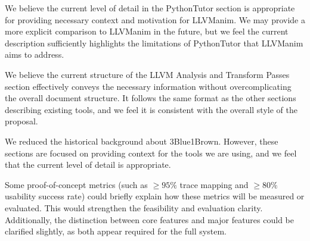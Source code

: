 {
  We believe the current level of detail in the PythonTutor section is appropriate for providing necessary context and motivation for LLVManim. We may provide a more explicit comparison to LLVManim in the future, but we feel the current description sufficiently highlights the limitations of PythonTutor that LLVManim aims to address.
}

{
  We believe the current structure of the LLVM Analysis and Transform Passes section effectively conveys the necessary information without overcomplicating the overall document structure. It follows the same format as the other sections describing existing tools, and we feel it is consistent with the overall style of the proposal.
}

{
  We reduced the historical background about 3Blue1Brown. However, these sections are focused on providing context for the tools we are using, and we feel that the current level of detail is appropriate.
}

\feedback
{Some proof-of-concept metrics (such as $\geq95\%$ trace mapping and $\geq80\%$ usability success rate) could briefly explain how these metrics will be measured or evaluated. This would strengthen the feasibility and evaluation clarity. Additionally, the distinction between core features and major features could be clarified slightly, as both appear required for the full system.}
{}

